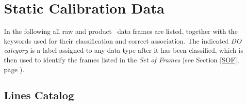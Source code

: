 \section{Static Calibration Data}
\label{CALDATA}

In the following all raw and product \pipename\, data frames are listed,
together with the keywords used for their classification and 
correct association. The indicated {\it DO category} is a 
label assigned to any data type after it has been classified,
which is then used to identify
the frames listed in the {\it Set of Frames} (see Section
\ref{SOF}, page \pageref{SOF}).

\subsection{Lines Catalog} 


\newpage
